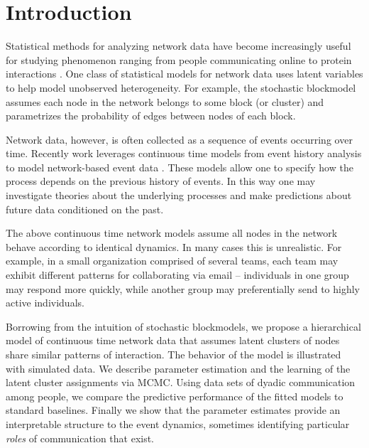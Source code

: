 \documentclass[11pt]{article}
\begin{document}
\section{Introduction}

Statistical methods for analyzing network data have become increasingly useful for studying  phenomenon ranging from people communicating online to protein interactions \cite{Goldenberg2009}.  One class of statistical models for network data uses latent variables to help model unobserved heterogeneity.  For example, the stochastic blockmodel \cite{Nowicki2001, Kemp} assumes each node in the network belongs to some block (or cluster) and parametrizes the probability of edges between nodes of each block.  %

Network data, however, is often collected as a sequence of events occurring over time.   Recently work leverages  continuous time models from event history analysis  \cite{AalenOddO.2008} to model network-based event data \cite{Butts2008,Brandes2009,Perry2011,Stadtfeld2010,Stadtfeld2011,Opsahl2011,Vu2011,Vu2011a}.  These models allow one to specify how the process depends on the previous history of events.  In this way one may investigate theories about the underlying processes and make predictions about future data conditioned on the past.

The above continuous time network models assume all nodes in the network behave according to identical dynamics.  In many cases this is unrealistic.  For example, in a small organization comprised of several teams, each team may exhibit different patterns for collaborating via email --  individuals in one group may respond more quickly, while another group may preferentially send to highly active individuals.  %

Borrowing from the intuition of stochastic blockmodels, we propose a hierarchical model of continuous time network data that assumes latent clusters of nodes share similar patterns of interaction.  The behavior of the model is illustrated with simulated data.  We describe parameter estimation and the learning of the latent cluster assignments via MCMC.  Using data sets of dyadic communication among people, we compare the predictive performance of the fitted models to standard baselines.  Finally we show that the parameter estimates provide an interpretable structure to the event dynamics, sometimes identifying particular \emph{roles} of communication that exist.
  
\end{document}
